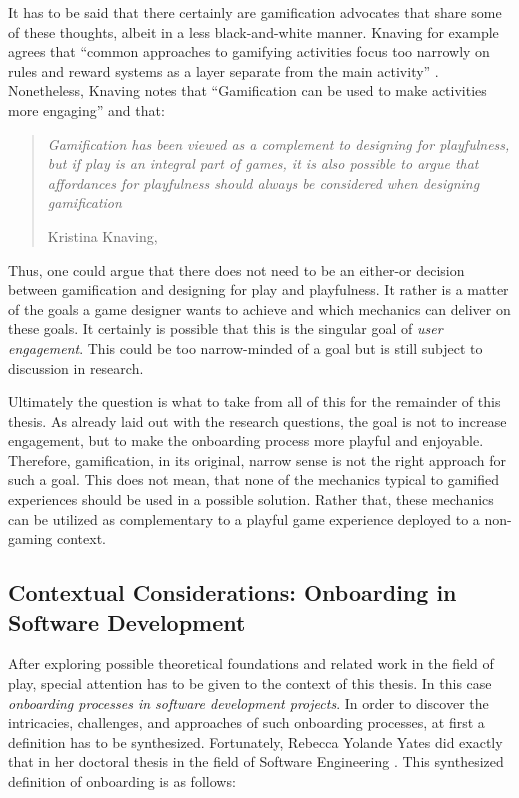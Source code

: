 It has to be said that there certainly are gamification advocates that share some of these thoughts, albeit in a less black-and-white manner. Knaving for example agrees that \enquote{common approaches to gamifying activities focus too narrowly on rules and reward systems as a layer separate from the main activity} \cite[p. 134]{knaving2013designing}. Nonetheless, Knaving notes that \enquote{Gamification can be used to make activities more engaging} \cite[p. 134]{knaving2013designing} and that:

\begin{quote}
  \textit{Gamification has been viewed as a complement to designing for playfulness, but if play is an integral part of games, it is also possible to argue that affordances for playfulness should always be considered when designing gamification}

  \footnotesize{Kristina Knaving, \cite[p. 133]{knaving2013designing}}
\end{quote}

Thus, one could argue that there does not need to be an either-or decision between gamification and designing for play and playfulness. It rather is a matter of the goals a game designer wants to achieve and which mechanics can deliver on these goals. It certainly is possible that this is the singular goal of \textit{user engagement}. This could be too narrow-minded of a goal but is still subject to discussion in research.

Ultimately the question is what to take from all of this for the remainder of this thesis. As already laid out with the research questions, the goal is not to increase engagement, but to make the onboarding process more playful and enjoyable. Therefore, gamification, in its original, narrow sense is not the right approach for such a goal. This does not mean, that none of the mechanics typical to gamified experiences should be used in a possible solution. Rather that, these mechanics can be utilized as complementary to a playful game experience deployed to a non-gaming context.

\subsection{Contextual Considerations: Onboarding in Software Development}

After exploring possible theoretical foundations and related work in the field of play, special attention has to be given to the context of this thesis. In this case \textit{onboarding processes in software development projects}. In order to discover the intricacies, challenges, and approaches of such onboarding processes, at first a definition has to be synthesized. Fortunately, Rebecca Yolande Yates did exactly that in her doctoral thesis in the field of Software Engineering \cite{yates2014onboarding}. This synthesized definition of onboarding is as follows:

